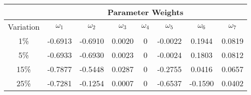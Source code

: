 \documentclass{article}
\begin{document}
\begin{center}
\begin{tabular}{|c||c|c|c|c|c|c|c|}
	\hline & \multicolumn{7}{c|}{\textbf{Parameter Weights}} \\ \hline
	Variation & $\omega_1$ & $\omega_2$ & $\omega_3$ & $\omega_4$ & $\omega_5$ & $\omega_6$ & $\omega_7$ \\ \hline \hline
	1\% & -0.6913 & -0.6910 & 0.0020 & 0 & -0.0022 & 0.1944 & 0.0819 \\ \hline
	5\% & -0.6933 & -0.6930 & 0.0023 & 0 & -0.0024 & 0.1803 & 0.0812 \\ \hline
	15\% & -0.7877 & -0.5448 & 0.0287 & 0 & -0.2755 & 0.0416 & 0.0657 \\ \hline
	25\% & -0.7281 & -0.1254 & 0.0007 & 0 & -0.6537 & -0.1590 & 0.0402 \\ \hline
\end{tabular}

\end{center}
\end{document}
